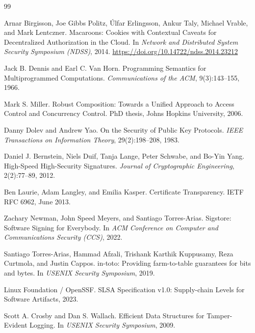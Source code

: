 \documentclass[11pt,a4paper]{article}
\theoremstyle{definition}
\theoremstyle{remark}
\begin{document}

\pdprintsolutions
\begin{thebibliography}{99}

Arnar Birgisson, Joe Gibbs Politz, Úlfar Erlingsson, Ankur Taly, Michael Vrable, and Mark Lentczner.
\newblock Macaroons: Cookies with Contextual Caveats for Decentralized Authorization in the Cloud.
\newblock In \textit{Network and Distributed System Security Symposium (NDSS)}, 2014.
\newblock \url{https://doi.org/10.14722/ndss.2014.23212}

Jack B. Dennis and Earl C. Van Horn.
\newblock Programming Semantics for Multiprogrammed Computations.
\newblock \textit{Communications of the ACM}, 9(3):143--155, 1966.

Mark S. Miller.
\newblock Robust Composition: Towards a Unified Approach to Access Control and Concurrency Control.
\newblock PhD thesis, Johns Hopkins University, 2006.

Danny Dolev and Andrew Yao.
\newblock On the Security of Public Key Protocols.
\newblock \textit{IEEE Transactions on Information Theory}, 29(2):198--208, 1983.

Daniel J. Bernstein, Niels Duif, Tanja Lange, Peter Schwabe, and Bo-Yin Yang.
\newblock High-Speed High-Security Signatures.
\newblock \textit{Journal of Cryptographic Engineering}, 2(2):77--89, 2012.

Ben Laurie, Adam Langley, and Emilia Kasper.
\newblock Certificate Transparency.
\newblock IETF RFC 6962, June 2013.

Zachary Newman, John Speed Meyers, and Santiago Torres-Arias.
\newblock Sigstore: Software Signing for Everybody.
\newblock In \textit{ACM Conference on Computer and Communications Security (CCS)}, 2022.

Santiago Torres-Arias, Hammad Afzali, Trishank Karthik Kuppusamy, Reza Curtmola, and Justin Cappos.
\newblock in-toto: Providing farm-to-table guarantees for bits and bytes.
\newblock In \textit{USENIX Security Symposium}, 2019.

Linux Foundation / OpenSSF.
\newblock SLSA Specification v1.0: Supply-chain Levels for Software Artifacts, 2023.

Scott A. Crosby and Dan S. Wallach.
\newblock Efficient Data Structures for Tamper-Evident Logging.
\newblock In \textit{USENIX Security Symposium}, 2009.


\end{thebibliography}
\end{document}

